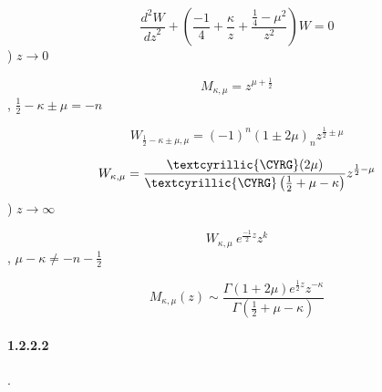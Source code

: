 \documentclass[a4paper]{article}
\begin{document}
\begin{equation*}
\frac{d^2W}{\mathit{dz}^2}+\left(\frac{-1} 4+\frac{\kappa } z+\frac{\frac 1 4-\mu ^2}{z^2}\right)W=0
\end{equation*}
{\cyrb})  $z\rightarrow 0$

\begin{equation*}
M_{\kappa ,\mu }=z^{\mu +\frac 1 2}
\end{equation*}
{\CYRV} {\cyrs}{\cyrl}{\cyru}{\cyrch}{\cyra}{\cyre}, {\cyre}{\cyrs}{\cyrl}{\cyri}  $\frac 1 2-\kappa \pm \mu =-n$

\begin{equation*}
W_{\frac 1 2-\kappa \pm \mu ,\mu }=\left(-1\right)^n(1\pm 2\mu )_nz^{\frac 1 2\pm \mu }
\end{equation*}
{\CYRI}{\cyrn}{\cyra}{\cyrch}{\cyre}

\begin{equation*}
W_{\kappa ,\mu }=\frac{\text{\textcyrillic{{\CYRG}}}(2\mu )}{\text{\textcyrillic{{\CYRG}}}\left(\frac 1 2+\mu -\kappa
\right)}z^{\frac 1 2-\mu }
\end{equation*}
{\cyrv})  $z\rightarrow {\infty}$

\begin{equation*}
W_{\kappa ,\mu }\ e^{\frac{-1} 2z}z^k
\end{equation*}
{\CYRV} {\cyrs}{\cyrl}{\cyru}{\cyrch}{\cyra}{\cyre}, {\cyre}{\cyrs}{\cyrl}{\cyri}  $\mu -\kappa {\neq}-n-\frac 1 2$

\begin{equation*}
M_{\kappa ,\mu }(z){\sim}\frac{\Gamma (1+2\mu )e^{\frac 1 2z}z^{-\kappa }}{\Gamma (\frac 1 2+\mu -\kappa )}
\end{equation*}
\paragraph[1.2.2.2 {\CYRT}{\cyre}{\cyro}{\cyrr}{\cyre}{\cyrt}{\cyri}{\cyrch}{\cyre}{\cyrs}{\cyrk}{\cyri}{\cyrishrt}
{\cyrv}{\cyrery}{\cyrv}{\cyro}{\cyrd} {\cyrr}{\cyra}{\cyrd}{\cyri}{\cyra}{\cyrl}{\cyrsftsn}{\cyrn}{\cyro}{\cyrishrt}
{\cyrf}{\cyru}{\cyrn}{\cyrk}{\cyrc}{\cyri}{\cyri}]{1.2.2.2
{\CYRT}{\cyre}{\cyro}{\cyrr}{\cyre}{\cyrt}{\cyri}{\cyrch}{\cyre}{\cyrs}{\cyrk}{\cyri}{\cyrishrt}
{\cyrv}{\cyrery}{\cyrv}{\cyro}{\cyrd} {\cyrr}{\cyra}{\cyrd}{\cyri}{\cyra}{\cyrl}{\cyrsftsn}{\cyrn}{\cyro}{\cyrishrt}
{\cyrf}{\cyru}{\cyrn}{\cyrk}{\cyrc}{\cyri}{\cyri}}
\hypertarget{RefHeading4681463868395}{}{\CYRR}{\cyra}{\cyrs}{\cyrs}{\cyrm}{\cyro}{\cyrt}{\cyrr}{\cyri}{\cyrm}
{\cyrr}{\cyra}{\cyrd}{\cyri}{\cyra}{\cyrl}{\cyrsftsn}{\cyrn}{\cyro}{\cyre}
{\cyru}{\cyrr}{\cyra}{\cyrv}{\cyrn}{\cyre}{\cyrn}{\cyri}{\cyre}. 
\end{document}

